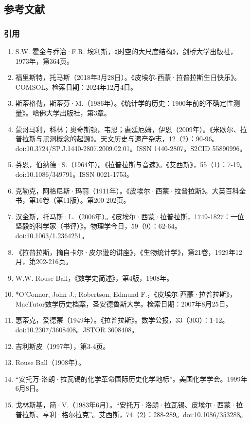 \subsection{参考文献}  
\subsubsection{引用}  
\begin{enumerate}
\item S.W. 霍金与乔治·F.R. 埃利斯，《时空的大尺度结构》，剑桥大学出版社，1973年，第364页。  
\item 福里斯特，托马斯（2018年3月28日）。《皮埃尔-西蒙·拉普拉斯生日快乐》。COMSOL。检索日期：2024年12月4日。  
\item 斯蒂格勒，斯蒂芬·M.（1986年）。《统计学的历史：1900年前的不确定性测量》。哈佛大学出版社，第3章。  
\item 蒙哥马利，科林；奥奇斯顿，韦恩；惠廷厄姆，伊恩（2009年）。《米歇尔、拉普拉斯与黑洞概念的起源》。天文历史与遗产杂志，12（2）：90-96。doi:10.3724/SP.J.1440-2807.2009.02.01。ISSN 1440-2807。S2CID 55890996。  
\item 芬恩，伯纳德·S.（1964年）。《拉普拉斯与音速》。《艾西斯》，55（1）：7-19。doi:10.1086/349791。ISSN 0021-1753。  
\item 克勒克，阿格尼斯·玛丽（1911年）。《皮埃尔·西蒙·拉普拉斯》。大英百科全书，第16卷（第11版）。第200-202页。  
\item 汉金斯，托马斯·L.（2006年）。《皮埃尔·西蒙·拉普拉斯，1749-1827：一位坚毅的科学家（书评）》。物理学今日，59（9）：62-64。doi:10.1063/1.2364251。  
\item 《拉普拉斯，摘自卡尔·皮尔逊的讲座》，《生物统计学》，第21卷，1929年12月，第202-216页。
\item W.W. Rouse Ball，《数学史简述》，第4版，1908年。  
\item *O'Connor, John J.; Robertson, Edmund F.，《皮埃尔-西蒙·拉普拉斯》，MacTutor数学历史档案，圣安德鲁斯大学。检索日期：2007年8月25日。  
\item 惠蒂克，爱德蒙（1949年）。《拉普拉斯》。数学公报，33（303）：1-12。doi:10.2307/3608408。JSTOR 3608408。  
\item 吉利斯皮（1997年），第3-4页。  
\item Rouse Ball（1908年）。  
\item “安托万-洛朗·拉瓦锡的化学革命国际历史化学地标”。美国化学学会。1999年6月8日。  
\item 戈林斯基，简·V.（1983年6月）。“安托万·洛朗·拉瓦锡、皮埃尔·西蒙·拉普拉斯、亨利·格尔拉克”。艾西斯，74（2）：288-289。doi:10.1086/353288。  

\end{enumerate}
